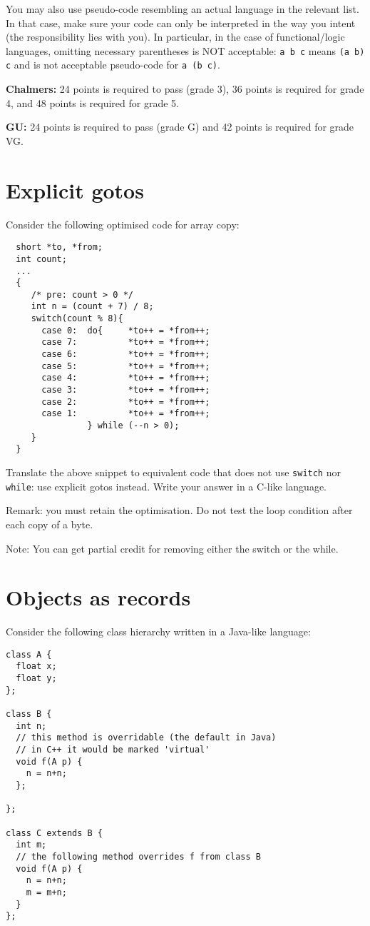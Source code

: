 \documentclass{article}
\begin{document}
You may also use pseudo-code resembling an actual language in the
relevant list. In that case, make sure your code can only be
interpreted in the way you intent (the responsibility lies with
you). In particular, in the case of functional/logic languages,
omitting necessary parentheses is NOT acceptable: \texttt{a b c} means
\texttt{(a b) c} and is not acceptable pseudo-code for \texttt{a (b
  c)}.


\textbf{Chalmers:}
24 points is required to pass (grade 3), 36 points is required for
grade 4, and 48 points is required for grade 5.

\textbf{GU:}
24 points is required to pass (grade G) and 42 points is
required for grade VG.

\section{Explicit gotos}

Consider the following optimised code for array copy:
\begin{verbatim}
  short *to, *from;
  int count;
  ...
  {
     /* pre: count > 0 */
     int n = (count + 7) / 8;
     switch(count % 8){
       case 0:	do{     *to++ = *from++;
       case 7:	        *to++ = *from++;
       case 6:	        *to++ = *from++;
       case 5:	        *to++ = *from++;
       case 4:	        *to++ = *from++;
       case 3:	        *to++ = *from++;
       case 2:	        *to++ = *from++;
       case 1:	        *to++ = *from++;
                } while (--n > 0);
     }
  }
\end{verbatim}

Translate the above snippet to equivalent code that does not use
\texttt{switch} nor \texttt{while}: use explicit gotos instead.
Write your answer in a C-like language.

Remark: you must retain the optimisation. Do not test the loop
condition after each copy of a byte.

Note: You can get partial credit for removing either the switch or the
while.
\newpage
\section{Objects as records}

Consider the following class hierarchy written in a Java-like
language:
\begin{verbatim}
class A {
  float x;
  float y;
};

class B {
  int n;
  // this method is overridable (the default in Java)
  // in C++ it would be marked 'virtual'
  void f(A p) {
    n = n+n;
  };

};

class C extends B {
  int m;
  // the following method overrides f from class B
  void f(A p) {
    n = n+n;
    m = m+n;
  }
};
\end{verbatim}
\end{document}
